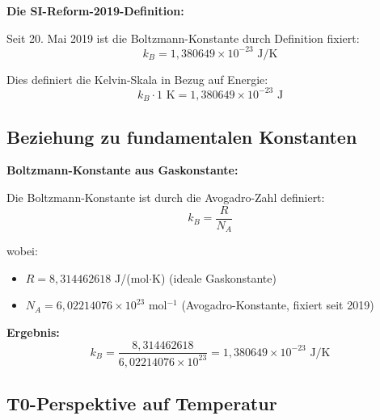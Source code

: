 	\begin{derivation}
		\textbf{Die SI-Reform-2019-Definition:}
		
		Seit 20. Mai 2019 ist die Boltzmann-Konstante durch Definition fixiert:
		\begin{equation}
			\boxed{k_B = 1{,}380649 \times 10^{-23} \text{ J/K}}
			\label{eq:kb_si}
		\end{equation}
		
		Dies definiert die Kelvin-Skala in Bezug auf Energie:
		\begin{equation}
			k_B \cdot 1 \text{ K} = 1{,}380649 \times 10^{-23} \text{ J}
		\end{equation}
	\end{derivation}
	
	\subsection{Beziehung zu fundamentalen Konstanten}
	
	\begin{keyresult}
		\textbf{Boltzmann-Konstante aus Gaskonstante:}
		
		Die Boltzmann-Konstante ist durch die Avogadro-Zahl definiert:
		\begin{equation}
			k_B = \frac{R}{N_A}
		\end{equation}
		
		wobei:
		\begin{itemize}
			\item $R = 8{,}314462618$ J/(mol$\cdot$K) (ideale Gaskonstante)
			\item $N_A = 6{,}02214076 \times 10^{23}$ mol$^{-1}$ (Avogadro-Konstante, fixiert seit 2019)
		\end{itemize}
		
		\textbf{Ergebnis:}
		\begin{equation}
			k_B = \frac{8{,}314462618}{6{,}02214076 \times 10^{23}} = 1{,}380649 \times 10^{-23} \text{ J/K}
		\end{equation}
	\end{keyresult}
	
	\subsection{T0-Perspektive auf Temperatur}
	
